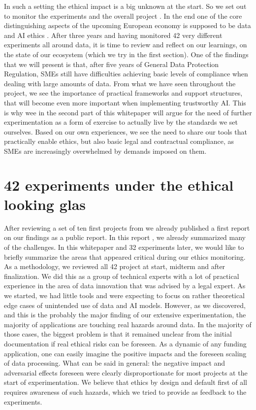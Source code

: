 \documentclass[	DIV=calc,%
							paper=a4,%
							fontsize=11pt,%
							twocolumn, draft]{scrartcl}	 					%
\begin{document}
In such a setting the ethical impact is a big unknown at the start. So we set out to monitor the experiments and the overall project \cite{D3.1}. In the end one of the core distinguishing aspects of the upcoming European economy is supposed to be data and AI ethics \cite{some digital strategy}.  After three years and having
monitored 42 very different experiments all around data, it is time to review and reflect on our learnings, on the state of our ecosystem (which we try in the first section). One of the findings that we will present is that, after five years of General Data Protection Regulation, SMEs still have difficulties achieving basic levels of compliance when dealing with large amounts of data. From what we have seen throughout the project, we see the importance of practical frameworks and support structures, that will become even more important when implementing trustworthy AI. This is why wee in the second part of this whitepaper will argue for the need of further experimentation as a form of exercise to actually live by the standards we set ourselves. Based on our own experiences, we see the need to share our tools that practically enable ethics, 
but also basic legal and contractual compliance, as SMEs are increasingly overwhelmed by demands imposed on them.


\section{42 experiments under the ethical looking glas}\label{}

After reviewing a set of ten first projects from we already published a first report on our findings as a public report. In this report \cite{DXX}, 
we already summarized many of the challenges. In this whitepaper and 32 experiments later, we would like to briefly summarize the areas that appeared critical during our ethics monitoring.
As a methodology, we reviewed all 42 project at start, midterm and after finalization. We did this as a group of technical experts with a lot of practical experience in the area of data innovation that was advised by a legal expert. As we started, we had little tools and were expecting to focus on rather theoretical edge cases of unintended use of data and AI models. However, as we discovered, and this is the probably the major finding of our extensive experimentation, the majority of applications are touching real hazards around data. In the majority of those cases, the biggest problem is that it remained unclear from the initial documentation if real ethical risks can be foreseen. As a dynamic of any funding application, one can easily imagine the positive impacts and the foreseen scaling of data processing. What can be said in general: the negative impact and adversarial effects foreseen were clearly disproportionate for most projects at the start of experimentation. We believe that ethics by design and default first of all requires awareness of such hazards, which we tried to provide as feedback to the experiments.
\end{document}
